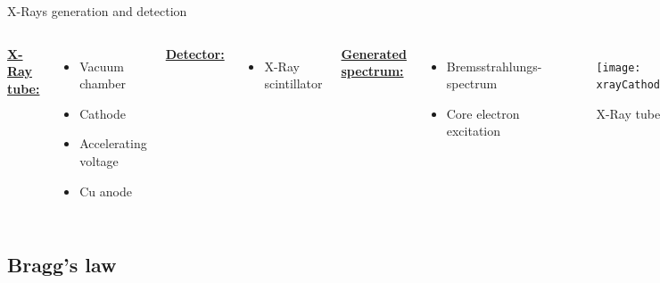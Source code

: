\documentclass{beamer}
\begin{document}
\begin{frame}{X-Rays generation and detection}
    \begin{columns}
        \underline{\textbf{X-Ray tube:}}
        \begin{itemize}
            \item Vacuum chamber
            \item Cathode
            \item Accelerating voltage
            \item Cu anode
        \end{itemize}
        \underline{\textbf{Detector:}}
        \begin{itemize}
            \item X-Ray scintillator
        \end{itemize}
        \underline{\textbf{Generated spectrum:}}
        \begin{itemize}
            \item Bremsstrahlungs-spectrum
            \item Core electron excitation
        \end{itemize}
        \begin{figure}
            \centering
            \texttt{[image: xrayCathode.png]}
            \caption{X-Ray tube}
        \end{figure}
        \vspace{-0.5cm}
        \begin{figure}
            \centering
            \texttt{[image: CuXraySpectrum.png]}
            \caption{X-Ray emission spectrum with Ni filter}
        \end{figure}
    \end{columns}    
\end{frame}

\subsection{Bragg's law}
\end{document}
